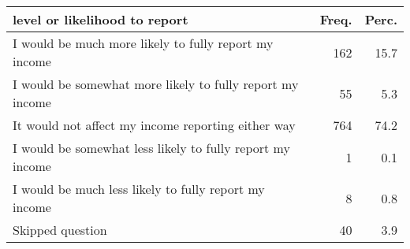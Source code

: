 \begin{table}[ht]
\centering
\begin{tabular}{lrr}
  \hline
level or likelihood to report & Freq. & Perc. \\ 
  \hline
I would be much more likely to fully report my income & 162 & 15.7 \\ 
  I would be somewhat more likely to fully report my income & 55 & 5.3 \\ 
  It would not affect my income reporting either way & 764 & 74.2 \\ 
  I would be somewhat less likely to fully report my income &  1 & 0.1 \\ 
  I would be much less likely to fully report my income &  8 & 0.8 \\ 
  Skipped question & 40 & 3.9 \\ 
   \hline
\end{tabular}
\end{table}
